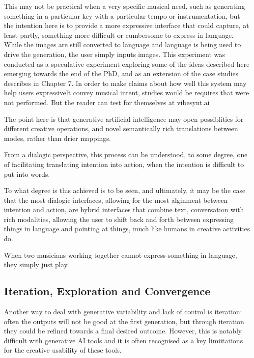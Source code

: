 This may not be practical when a very specific musical need, such as generating something in a particular key with a particular tempo or instrumentation, but the intention here is to provide a more expressive interface that could capture, at least partly, something more difficult or cumbersome to express in language. While the images are still converted to language and language is being used to drive the generation, the user simply inputs images. This experiment was conducted as a speculative experiment exploring some of the ideas described here emerging towards the end of the PhD, and as an extension of the case studies describes in Chapter 7. In order to make claims about how well this system may help users expressivelt convey musical intent, studies would be requires that were not performed. But the reader can test for themselves at vibesynt.ai

The point here is that generative artificial intelligence may open possiblities for different creative operations, and novel semantically rich translations between modes, rather than drier mappings. 

From a dialogic perspective, this process can be understood, to some degree, one of facilitating translating intention into action, when the intention is difficult to put into words. 

To what degree is this achieved is to be seen, and ultimately, it may be the case that the most dialogic interfaces, allowing for the most alginment between intention and action, are hybrid interfaces that combine text, conversation with rich modalities, allowing the user to shift back and forth between expressing things in language and pointing at things, much like humans in creative activities do. 

When two musicians working together cannot express something in language, they simply just play. 


\subsection{Iteration, Exploration and Convergence}

Another way to deal with generative variability and lack of control is iteration: often the outputs will not be good at the first generation, but through iteration they could be refined towards a final desired outcome. However, this is notably difficult with generative AI tools and it is often recognised as a key limiitations for the creative usability of these tools. 

